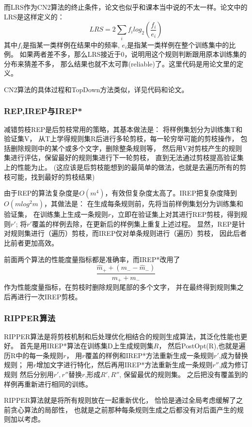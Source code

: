 \documentclass[UTF8]{article}
\begin{document}
    而LRS作为CN2算法的终止条件，论文也似乎和课本当中说的不太一样。论文中的LRS是这样定义的：
    \begin{equation}
        LRS = 2\sum_i f_i log_2(\dfrac{f_i}{e_i})
    \end{equation}
    其中$f_i$是指某一类样例在结果中的频率, $e_i$是指某一类样例在整个训练集中的比例。
    如果两者差不多，那么LRS接近于0，说明用这个规则判断跟用原本训练集的分布来猜差不多，
    那么结果也就不太可靠(reliable)了。这里代码是用论文里的定义。

    CN2算法的具体过程和TopDown方法类似，详见代码和论文。

\subsubsection{REP,IREP与IREP*}
    减错剪枝REP是后剪枝常用的策略，其基本做法是：
    将样例集划分为训练集T和验证集V，
    从T上学得规则集R后进行多轮剪枝，每一轮穷举可能的剪枝操作，
    包括删除规则中的某个或多个文字，删除整条规则等，
    然后用V对剪枝产生的规则集进行评估，保留最好的规则集进行下一轮剪枝，
    直到无法通过剪枝提高验证集上的性能为止。
    (这应该是后剪枝能想到的最简单的做法，也就是去遍历所有的剪枝可能，找到最好的剪枝结果)

    由于REP的算法复杂度是$O(m^4)$，有效但复杂度太高了。IREP把复杂度降到$O(mlog^2m)$，其做法是：
    在生成每条规则前，先将当前样例集划分为训练集和验证集，
    在训练集上生成一条规则$r$，立即在验证集上对其进行REP剪枝，得到规则$r'$;
    将$r'$覆盖的样例去除，在更新后的样例集上重复上述过程。
    显然，REP是针对规则集进行（遍历）剪枝，而IREP仅对单条规则进行（遍历）剪枝，
    因此后者比前者更加高效。

    前面两个算法的性能度量指标都是准确率，而IREP*改用了
    $$\dfrac{\hat{m}_++(m_--\hat{m}_-)}{m_++m_-}$$
    作为性能度量指标，在剪枝时删除规则尾部的多个文字，
    并在最终得到规则集之后再进行一次IREP剪枝。

\subsubsection{RIPPER算法}
    RIPPER算法是将剪枝机制和后处理优化相结合的规则生成算法，其泛化性能也更好。
    首先是用IREP*算法在训练集D上生成规则集$R$，
    然后PostOpt(R),也就是遍历R中的每一条规则$r$，
    用$r$覆盖的样例和IREP*方法重新生成一条规则$r'$,成为替换规则；
    用$r$增加文字进行特化，然后再用IREP*方法重新生成一条规则$r''$,成为修订规则
    然后分别用$r',r''$替换$r$,形成$R',R''$, 保留最优的规则集。
    之后把没有覆盖到的样例再重新进行相同的训练。

    RIPPER算法就是将所有规则放在一起重新优化，
    恰恰是通过全局考虑缓解了之前贪心算法的局部性，
    也就是之前那种每条规则生成之后都没有对后面产生的规则加以考虑。
\end{document}
